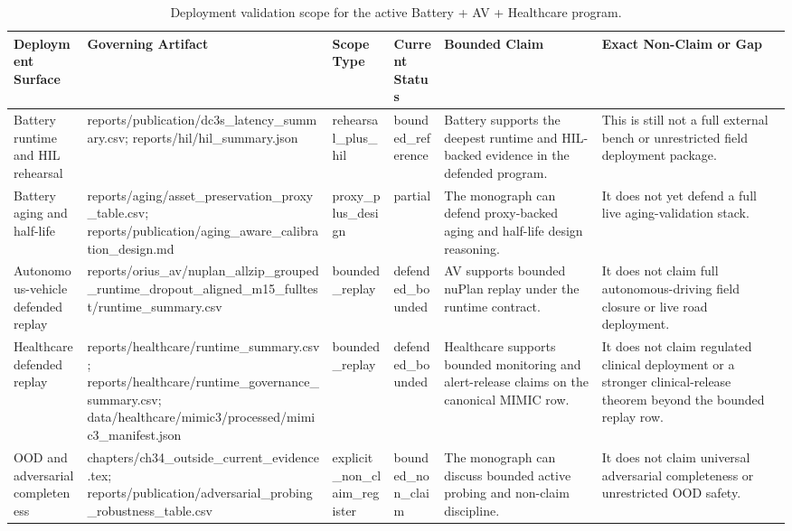 \begin{table}[htbp]
\centering
\caption{Deployment validation scope for the active Battery + AV + Healthcare program.}
\label{tbl:orius-deployment-validation-scope}
\begin{tabular}{llllll}
\toprule
Deployment Surface & Governing Artifact & Scope Type & Current Status & Bounded Claim & Exact Non-Claim or Gap\\
\midrule
Battery runtime and HIL rehearsal & reports/publication/dc3s\_latency\_summary.csv; reports/hil/hil\_summary.json & rehearsal\_plus\_hil & bounded\_reference & Battery supports the deepest runtime and HIL-backed evidence in the defended program. & This is still not a full external bench or unrestricted field deployment package.\\
Battery aging and half-life & reports/aging/asset\_preservation\_proxy\_table.csv; reports/publication/aging\_aware\_calibration\_design.md & proxy\_plus\_design & partial & The monograph can defend proxy-backed aging and half-life design reasoning. & It does not yet defend a full live aging-validation stack.\\
Autonomous-vehicle defended replay & reports/orius\_av/nuplan\_allzip\_grouped\_runtime\_dropout\_aligned\_m15\_fulltest/runtime\_summary.csv & bounded\_replay & defended\_bounded & AV supports bounded nuPlan replay under the runtime contract. & It does not claim full autonomous-driving field closure or live road deployment.\\
Healthcare defended replay & reports/healthcare/runtime\_summary.csv; reports/healthcare/runtime\_governance\_summary.csv; data/healthcare/mimic3/processed/mimic3\_manifest.json & bounded\_replay & defended\_bounded & Healthcare supports bounded monitoring and alert-release claims on the canonical MIMIC row. & It does not claim regulated clinical deployment or a stronger clinical-release theorem beyond the bounded replay row.\\
OOD and adversarial completeness & chapters/ch34\_outside\_current\_evidence.tex; reports/publication/adversarial\_probing\_robustness\_table.csv & explicit\_non\_claim\_register & bounded\_non\_claim & The monograph can discuss bounded active probing and non-claim discipline. & It does not claim universal adversarial completeness or unrestricted OOD safety.\\
\bottomrule
\end{tabular}
\end{table}
